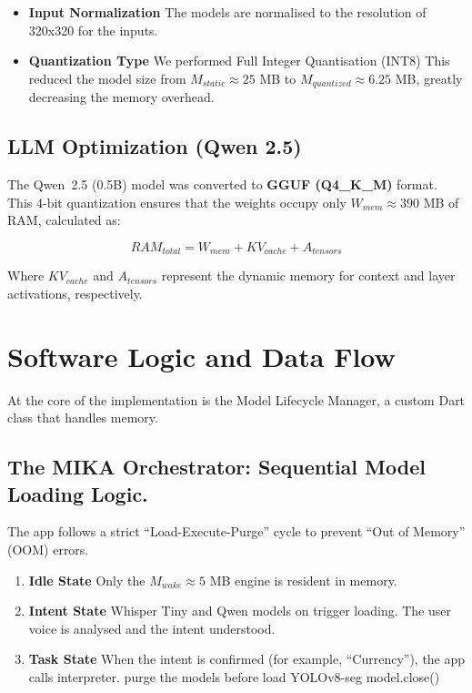 \documentclass[12pt,a4paper]{report}
\begin{document}
\begin{itemize}
    \item[1.] \textbf{Input Normalization} The models are normalised to the resolution of 320x320 for the inputs.
    \item[2.] \textbf{Quantization Type} We performed Full Integer Quantisation (INT8) This reduced the model size from $M_{static} \approx 25$ MB to $M_{quantized} \approx 6.25$ MB, greatly decreasing the memory overhead.
\end{itemize}

\subsection{LLM Optimization (Qwen 2.5)}
The Qwen~2.5 (0.5B) model was converted to \textbf{GGUF (Q4\_K\_M)} format. This $4\text{-bit}$ quantization ensures that the weights occupy only $W_{mem} \approx 390$ MB of RAM, calculated as:
 
\begin{equation}
    RAM_{total} = W_{mem} + KV_{cache} + A_{tensors}
\end{equation}
 
Where $KV_{cache}$ and $A_{tensors}$ represent the dynamic memory for context and layer activations, respectively.
 
\section{Software Logic and Data Flow}
At the core of the implementation is the Model Lifecycle Manager, a custom Dart class that handles memory.

\subsection{The MIKA Orchestrator: Sequential Model Loading Logic.}
The app follows a strict “Load-Execute-Purge” cycle to prevent “Out of Memory” (OOM) errors.
 
\begin{enumerate}
    \item \textbf{Idle State} Only the $M_{wake} \approx 5$ MB engine is resident in memory.
    \item \textbf{Intent State} Whisper Tiny and Qwen models on trigger loading. The user voice is analysed and the intent understood. 
    \item \textbf{Task State} When the intent is confirmed (for example, “Currency”), the app calls interpreter. purge the models before load YOLOv8-seg model.close()
\end{enumerate}
\end{document}
